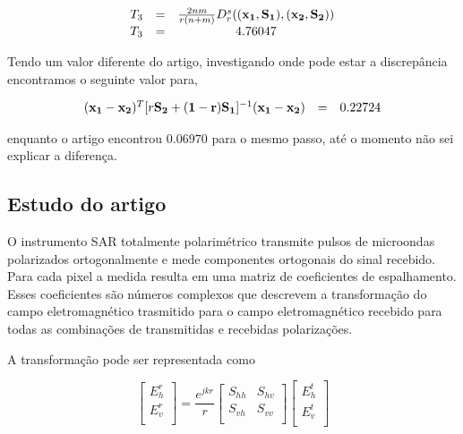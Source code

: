 \documentclass[10pt,a4paper]{article}
\begin{document}
\begin{description}
\begin{equation}\label{sec3eqn4}
\begin{array}{ccc}
	T_3&=&\frac{2nm}{r(n+m)}D_r^s(({\bf x_1}, {\bf S_1}),({\bf x_2}, {\bf S_2})) \\
	T_3&=&4.76047
\end{array}
\end{equation}

Tendo um valor diferente do artigo, investigando onde pode estar a discrepância encontramos o seguinte valor para, 

\begin{equation}\label{sec3eqn5}
\begin{array}{ccc}
	({\bf x_1}-{\bf x_2})^T [r{\bf S_2+(1-r){\bf S_1}}]^{-1}({\bf x_1}-{\bf x_2})&=& 0.22724\\
\end{array}
\end{equation}

enquanto o artigo encontrou $0.06970$ para o mesmo passo, até o momento não sei explicar a diferença.

\end{description}


\subsection{Estudo do artigo  \cite{anfinsen2009}}

O instrumento SAR totalmente polarimétrico transmite pulsos de microondas polarizados ortogonalmente e mede componentes ortogonais do sinal recebido. Para cada pixel a medida resulta em uma matriz de coeficientes de espalhamento. Esses coeficientes são números complexos que descrevem a transformação do campo eletromagnético trasmitido para o campo eletromagnético recebido para todas as combinações de transmitidas e recebidas polarizações.

A transformação pode ser representada como

\begin{equation}\label{sec4eqn1}
 \left[
\begin{array}{c}
	E_{h}^{r}   \\
	E_{v}^{r}    \\
\end{array}
\right]
 = \frac{e^{jkr}}{r}\left[
\begin{array}{cc}
	S_{hh}   & S_{hv}   \\
	S_{vh}   & S_{vv}   \\
\end{array}
\right]
 \left[
\begin{array}{c}
	E_{h}^{t}   \\
	E_{v}^{t}    \\
\end{array}
\right]
\end{equation}
\end{document}
